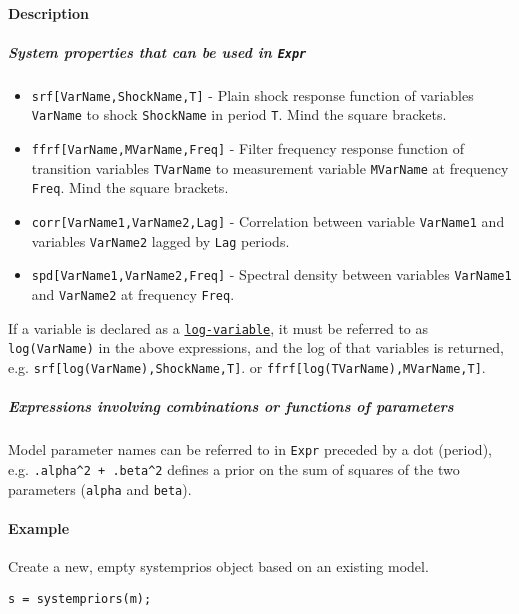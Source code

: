 \paragraph{Description}\label{description}

\subparagraph{System properties that can be used in
\texttt{Expr}}\label{system-properties-that-can-be-used-in-expr}

\begin{itemize}
\item
  \texttt{srf{[}VarName,ShockName,T{]}} - Plain shock response function
  of variables \texttt{VarName} to shock \texttt{ShockName} in period
  \texttt{T}. Mind the square brackets.
\item
  \texttt{ffrf{[}VarName,MVarName,Freq{]}} - Filter frequency response
  function of transition variables \texttt{TVarName} to measurement
  variable \texttt{MVarName} at frequency \texttt{Freq}. Mind the square
  brackets.
\item
  \texttt{corr{[}VarName1,VarName2,Lag{]}} - Correlation between
  variable \texttt{VarName1} and variables \texttt{VarName2} lagged by
  \texttt{Lag} periods.
\item
  \texttt{spd{[}VarName1,VarName2,Freq{]}} - Spectral density between
  variables \texttt{VarName1} and \texttt{VarName2} at frequency
  \texttt{Freq}.
\end{itemize}

If a variable is declared as a
\href{modellang/logvariables}{\texttt{log-variable}}, it must be
referred to as \texttt{log(VarName)} in the above expressions, and the
log of that variables is returned, e.g.
\texttt{srf{[}log(VarName),ShockName,T{]}}. or
\texttt{ffrf{[}log(TVarName),MVarName,T{]}}.

\subparagraph{Expressions involving combinations or functions of
parameters}\label{expressions-involving-combinations-or-functions-of-parameters}

Model parameter names can be referred to in \texttt{Expr} preceded by a
dot (period), e.g. \texttt{.alpha\^{}2 + .beta\^{}2} defines a prior on
the sum of squares of the two parameters (\texttt{alpha} and
\texttt{beta}).

\paragraph{Example}\label{example}

Create a new, empty systemprios object based on an existing model.

\begin{verbatim}
s = systempriors(m);
\end{verbatim}

